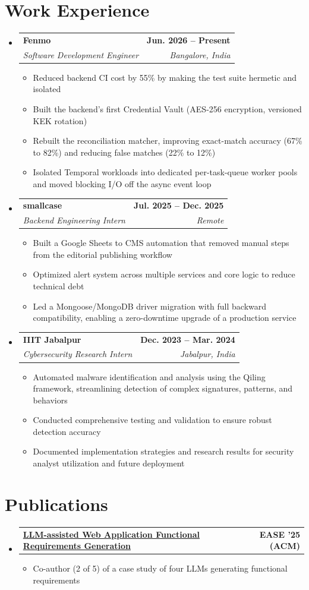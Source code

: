 \documentclass[a4paper,11pt]{article}
\makeatletter
\newcommand{\resumeItem}[1]{
  \item\small{
    {#1 \vspace{-2pt}}
  }
}
\newcommand{\resumeSubheading}[4]{
  \vspace{-2pt}\item
    \begin{tabular*}{1.0\textwidth}[t]{l@{\extracolsep{\fill}}r}
      \textbf{#1} & \textbf{\small #2} \\
      \textit{\small#3} & \textit{\small #4} \\
    \end{tabular*}\vspace{-7pt}
}
\newcommand{\resumeAchievementheading}[2]{
    \vspace{-2pt}\item
    \begin{tabular*}{1.0\textwidth}[t]{l@{\extracolsep{\fill}}r}
      \textbf{#1} & \textbf{\small #2} \\
    \end{tabular*}\vspace{-7pt}
}
\newcommand{\resumeSubHeadingListStart}{\begin{itemize}[leftmargin=0.0in, label={}]}
\newcommand{\resumeSubHeadingListEnd}{\end{itemize}}
\newcommand{\resumeItemListStart}{\begin{itemize}}
\newcommand{\resumeItemListEnd}{\end{itemize}\vspace{-5pt}}
\makeatother
\begin{document}
    \section{Work Experience}
    \resumeSubHeadingListStart
        \resumeSubheading
            {Fenmo}{Jun. 2026 -- Present}
            {Software Development Engineer}{Bangalore, India}
                \resumeItemListStart
                    \resumeItem{Reduced backend CI cost by 55\% by making the test suite hermetic and isolated}
                    \resumeItem{Built the backend's first Credential Vault (AES-256 encryption, versioned KEK rotation)}
                    \resumeItem{Rebuilt the reconciliation matcher, improving exact-match accuracy (67\% to 82\%) and reducing false matches (22\% to 12\%)}
                    \resumeItem{Isolated Temporal workloads into dedicated per-task-queue worker pools and moved blocking I/O off the async event loop}
                \resumeItemListEnd

        \resumeSubheading
            {smallcase}{Jul. 2025 -- Dec. 2025}
            {Backend Engineering Intern}{Remote}
                \resumeItemListStart
                    \resumeItem{Built a Google Sheets to CMS automation that removed manual steps from the editorial publishing workflow}
                    \resumeItem{Optimized alert system across multiple services and core logic to reduce technical debt}
                    \resumeItem{Led a Mongoose/MongoDB driver migration with full backward compatibility, enabling a zero-downtime upgrade of a production service}
                \resumeItemListEnd

        \resumeSubheading
            {IIIT Jabalpur}{Dec. 2023 -- Mar. 2024}
            {Cybersecurity Research Intern}{Jabalpur, India}
                \resumeItemListStart
                    \resumeItem{Automated malware identification and analysis using the Qiling framework, streamlining detection of complex signatures, patterns, and behaviors}
                    \resumeItem{Conducted comprehensive testing and validation to ensure robust detection accuracy}
                    \resumeItem{Documented implementation strategies and research results for security analyst utilization and future deployment}
                \resumeItemListEnd
    \resumeSubHeadingListEnd
    \vspace{-16pt}

    \section{Publications}
        \resumeSubHeadingListStart
            \resumeAchievementheading
            {\href{https://doi.org/10.1145/3756681.3756992}{LLM-assisted Web Application Functional Requirements Generation}}{EASE '25 (ACM)}
                \resumeItemListStart
                    \resumeItem{Co-author (2 of 5) of a case study of four LLMs generating functional requirements}
                \resumeItemListEnd
        \resumeSubHeadingListEnd
        \vspace{-15pt}
\end{document}

